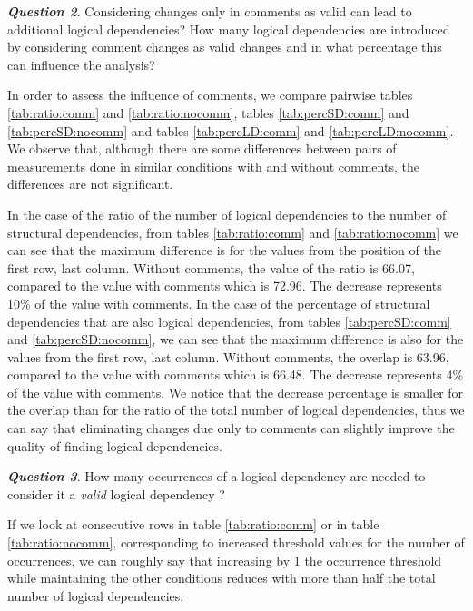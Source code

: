 \documentclass[conference]{IEEEtran}
\begin{document}
\textit{\textbf{Question 2}}. Considering changes only in comments as valid can lead to additional logical dependencies? How many logical dependencies are introduced by considering comment changes as valid changes and in what percentage this can influence the analysis?

In order to assess the influence of comments, we compare pairwise tables \ref{tab:ratio:comm} and \ref{tab:ratio:nocomm},  
tables \ref{tab:percSD:comm} and \ref{tab:percSD:nocomm} and tables \ref{tab:percLD:comm} and \ref{tab:percLD:nocomm}. 
We observe that, although there are some differences between pairs of measurements done in similar conditions with and without comments, the differences are not significant.

In the case of the ratio of the number of logical dependencies to the number of structural dependencies, from tables \ref{tab:ratio:comm} and \ref{tab:ratio:nocomm} we can see that the maximum difference is for the values from the position of the first row, last column. Without comments, the value of the ratio is 66.07, compared to the value with comments which is 72.96. The decrease represents 10\% of the value with comments. In the case of the percentage of structural dependencies that are also logical dependencies, from tables \ref{tab:percSD:comm} and \ref{tab:percSD:nocomm}, we can see that the maximum difference is also for the values from the first row, last column. Without comments, the overlap is 63.96, compared to the value with comments which is 66.48.  The decrease represents 4\% of the value with comments. We notice that the decrease percentage is smaller for the overlap than for the ratio of the total number of logical dependencies, thus we can say that eliminating changes due only to comments can slightly improve the quality of finding logical dependencies. 



\textit{\textbf{Question 3}}. How many occurrences of a logical dependency are needed to consider it a \textit{valid} logical dependency ? 

If we look at consecutive rows in table \ref{tab:ratio:comm} or in table \ref{tab:ratio:nocomm}, corresponding to increased threshold values for the number of occurrences, we can roughly say that  increasing by 1 the occurrence threshold while maintaining the other conditions reduces with more than half the total number of logical dependencies.  
\end{document}

